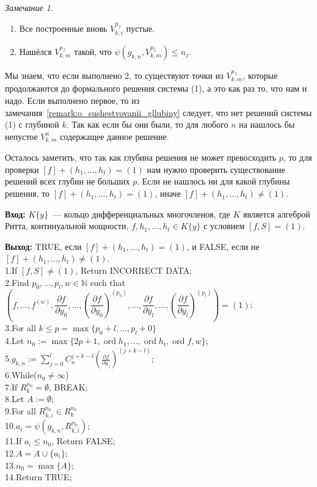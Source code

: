 \documentclass[16pt]{article}
\DeclareMathOperator{\ord}{ord}
\renewcommand{\le}{\leqslant} %
\theoremstyle{plain1}
\theoremstyle{plain2}
\theoremstyle{plain}
\theoremstyle{plain3}
\theoremstyle{definition}
\theoremstyle{remark}
\newtheorem{remark}[theorem1]{Замечание}
\begin{document}
\begin{remark}
\begin{enumerate}
  \item Все построенные вновь ${V}_{k,i}^{n_j}$ пустые.
  \item Нашёлся ${V}_{k,m}^{n_j}$ такой, что $ \psi(g_{k,n},{V}_{k,m}^{n_j})\le n_j$.
\end{enumerate}

Мы знаем, что если выполнено 2, то существуют точки из ${V}_{k,m}^{n_j}$, которые продолжаются до формального решения системы (1), а это как раз то, что нам и надо. Если выполнено первое, то из замечания~\ref{remark:o_sushestvovanii_gllubiny} следует, что нет решений системы (1)  с глубиной $k$. Так как если бы они были, то для любого $n$ на нашлось бы непустое ${V}_{k,m}^{n}$ содержащее данное решение.

Осталось заметить, что так как глубина решения не может превосходить $p$, то для проверки $[f]+(h_1,\ldots,h_t)=(1)$ нам нужно проверить существование решений всех глубин не больших $p$. Если не нашлось ни для какой глубины решения, то $[f]+(h_1,\ldots,h_t)=(1)$, иначе $[f]+(h_1,\ldots,h_t)\neq(1)$.
\end{remark}

{\bf Вход:} $K\{y\}$~--- кольцо дифференциальных многочленов, где $K$ является алгеброй Ритта, континуальной мощности, $f,h_1,\ldots,h_t \in K\{y\}$ с условием $[f,S]=(1)$.

{\bf Выход:} TRUE, если  $[f]+(h_1,\ldots,h_t)=(1)$, и FALSE, если не $[f]+(h_1,\ldots,h_t)\not=(1)$.
\\
1.\qquad If $[f,S]\not=(1)$, Return  INCORRECT DATA;\\
2.\qquad Find $p_0, \ldots, p_l, w\in \mathbb{N}$ such that $\left(f,\ldots, f^{(w)}, \dfrac{\partial f}{\partial y_0},\ldots,(\dfrac{\partial f}{\partial y_0})^{(p_0)},\ldots, \dfrac{\partial f}{\partial y_l},\ldots,(\dfrac{\partial f}{\partial y_l})^{(p_l)}\right)=(1)$;\\
3.\qquad For all $k\le p =\max\{ p_0+l,\ldots,p_l+0\} $\\
4.\qquad\qquad Let $n_0:=\max\{ 2p+1,\ord{h_1},\ldots, \ord{h_t},\ord{f},w\}$;\\
5.\qquad\qquad $g_{k,n}:=\sum\limits_{j=0}^{l}C_n^{j+k - l }\left(\frac{\partial f}{\partial y_j}\right)^{(j+k - l)}$;\\
6.\qquad\qquad While($n_0\not=\infty$)\\
7.\qquad\qquad\qquad If $R_k^{n_0}=\emptyset$, BREAK;\\
8.\qquad\qquad\qquad Let $A:=\emptyset$;\\
9.\qquad\qquad\qquad For all ${R}_{k,i}^{n_0}\in R_k^{n_0}$\\
10.\qquad\qquad\qquad\qquad $a_i=\psi(g_{k,n},{R}_{k,i}^{n_0})$;\\
11.\qquad\qquad\qquad\qquad If $a_i\le n_0$, Return FALSE;\\
12.\qquad\qquad\qquad\qquad $A=A\cup\{a_i\}$;\\
13.\qquad\qquad\qquad $n_0=\max\{A\}$;\\
14.\qquad Return TRUE;
\end{document}
